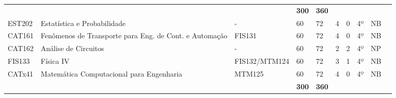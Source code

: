 \begin{table}[]
{\begin{tabular}{l|l|l|l|l|l|l|l|l|l}
			\multicolumn{1}{|l|}{}                              &                                                          &                               & \textbf{300}                                                 & \textbf{360}               &                          &                           &                            &                         &  \\ \cline{1-9}
			\multicolumn{1}{|l|}{EST202}                        & Estatística e Probabilidade                              & -                             & 60                                                           & 72                         & 4                        & 0                         & 4º                         & NB                      &  \\ \cline{1-9}
			\multicolumn{1}{|l|}{CAT161}                        & Fenômenos de Transporte para Eng. de Cont. e Automação   & FIS131                        & 60                                                           & 72                         & 4                        & 0                         & 4º                         & NB                      &  \\ \cline{1-9}
			\multicolumn{1}{|l|}{CAT162}                        & Análise de Circuitos                                     & -                             & 60                                                           & 72                         & 2                        & 2                         & 4º                         & NP                      &  \\ \cline{1-9}
			\multicolumn{1}{|l|}{FIS133}                        & Física IV                                                & FIS132/MTM124                 & 60                                                           & 72                         & 3                        & 1                         & 4º                         & NB                      &  \\ \cline{1-9}
			\multicolumn{1}{|l|}{CATx41}                        & Matemática Computacional para Engenharia & MTM125                & 60                                                           & 72                         & 4                        & 0                         & 4º                         & NB                      &  \\ \cline{1-9}
			\multicolumn{1}{|l|}{}                              &                                                          &                               & \textbf{300}                                                 & \textbf{360}               &                          &                           &                            &                         &  \\ \cline{1-9}

\end{tabular}}
\end{table}
